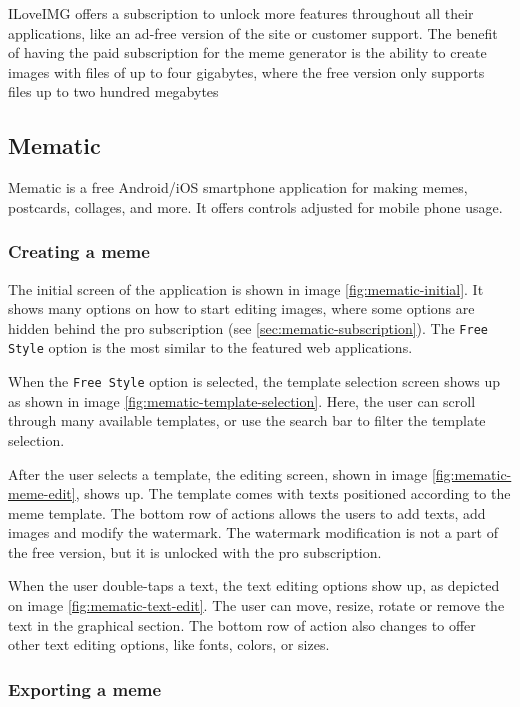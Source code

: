 ILoveIMG offers a subscription to unlock more features throughout all their applications, like an ad-free version of the site or customer support. The benefit of having the paid subscription for the meme generator is the ability to create images with files of up to four gigabytes, where the free version only supports files up to two hundred megabytes \cite{iloveimg-pricing}

\subsection{Mematic}

Mematic is a free Android/iOS smartphone application for making memes, postcards, collages, and more. It offers controls adjusted for mobile phone usage.

\subsubsection{Creating a meme}

The initial screen of the application is shown in image \ref{fig:mematic-initial}. It shows many options on how to start editing images, where some options are hidden behind the pro subscription (see \autoref{sec:mematic-subscription}). The \texttt{Free Style} option is the most similar to the featured web applications.

When the \texttt{Free Style} option is selected, the template selection screen shows up as shown in image \ref{fig:mematic-template-selection}. Here, the user can scroll through many available templates, or use the search bar to filter the template selection.

After the user selects a template, the editing screen, shown in image \ref{fig:mematic-meme-edit}, shows up. The template comes with texts positioned according to the meme template. The bottom row of actions allows the users to add texts, add images and modify the watermark. The watermark modification is not a part of the free version, but it is unlocked with the pro subscription.

When the user double-taps a text, the text editing options show up, as depicted on image \ref{fig:mematic-text-edit}. The user can move, resize, rotate or remove the text in the graphical section. The bottom row of action also changes to offer other text editing options, like fonts, colors, or sizes.

\subsubsection{Exporting a meme}

